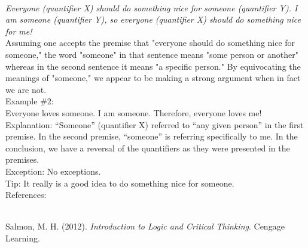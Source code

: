 \documentclass[a4paper,12pt,single,pdftex]{scrartcl}
\begin{document}
    \\

    
      {\em Everyone (quantifier X) should do something nice for someone (quantifier Y). I am someone (quantifier Y), so everyone (quantifier X) should do something nice for me!}
    \\

    
      Assuming one accepts the premise that "everyone should do something nice for someone," the word "someone" in that sentence means "some person or another" whereas in the second sentence it means "a specific person." By equivocating the meanings of "someone," we appear to be making a strong argument when in fact we are not.
    \\

    
      Example \#2:
    \\

    
      Everyone loves someone. \newline
I am someone. \newline
Therefore, everyone loves me!
    \\

    
      Explanation: “Someone” (quantifier X) referred to “any given person” in the first premise. In the second premise, “someone” is referring specifically to me. In the conclusion, we have a reversal of the quantifiers as they were presented in the premises.
    \\

    
      Exception: No exceptions.
    \\

    
      Tip: It really is a good idea to do something nice for someone.
    \\

    References:

    
      
        
      \\

      
        
          Salmon, M. H. (2012). {\it Introduction to Logic and Critical Thinking}. Cengage Learning.
        
      
    
\end{document}
